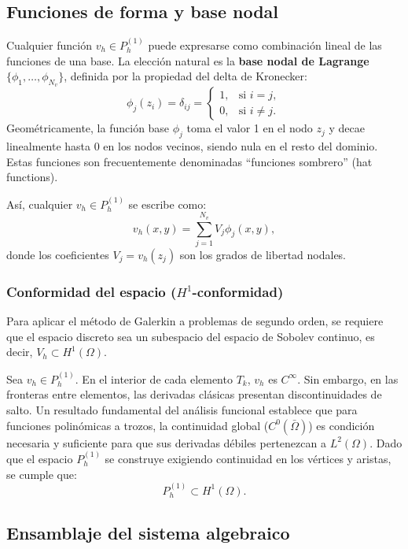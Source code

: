\documentclass[12pt, letterpaper]{report}
\theoremstyle{definition}
\begin{document}
\subsection{Funciones de forma y base nodal}

Cualquier función $v_h \in P_h^{(1)}$ puede expresarse como combinación lineal de las funciones de una base. La elección natural es la \textbf{base nodal de Lagrange} $\{ \phi_1, \ldots, \phi_{N_v} \}$, definida por la propiedad del delta de Kronecker:
\begin{equation}
    \phi_j(z_i) = \delta_{ij} =
    \begin{cases}
        1, & \text{si } i=j, \\
        0, & \text{si } i\neq j.
    \end{cases}
\end{equation}
Geométricamente, la función base $\phi_j$ toma el valor 1 en el nodo $z_j$ y decae linealmente hasta 0 en los nodos vecinos, siendo nula en el resto del dominio. Estas funciones son frecuentemente denominadas ``funciones sombrero'' (hat functions).

Así, cualquier $v_h \in P_h^{(1)}$ se escribe como:
\begin{equation}
    v_h(x,y) = \sum_{j=1}^{N_v} V_j \phi_j(x,y),
\end{equation}
donde los coeficientes $V_j = v_h(z_j)$ son los grados de libertad nodales.

\subsubsection{Conformidad del espacio ($H^1$-conformidad)}

Para aplicar el método de Galerkin a problemas de segundo orden, se requiere que el espacio discreto sea un subespacio del espacio de Sobolev continuo, es decir, $V_h \subset H^1(\Omega)$.

Sea $v_h \in P_h^{(1)}$. En el interior de cada elemento $T_k$, $v_h$ es $C^\infty$. Sin embargo, en las fronteras entre elementos, las derivadas clásicas presentan discontinuidades de salto. Un resultado fundamental del análisis funcional establece que para funciones polinómicas a trozos, la continuidad global ($C^0(\bar{\Omega})$) es condición necesaria y suficiente para que sus derivadas débiles pertenezcan a $L^2(\Omega)$. Dado que el espacio $P_h^{(1)}$ se construye exigiendo continuidad en los vértices y aristas, se cumple que:
\[
P_h^{(1)} \subset H^1(\Omega).
\]

\subsection{Ensamblaje del sistema algebraico}
\end{document}
